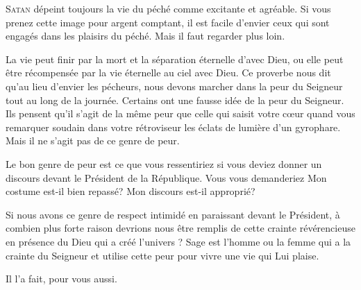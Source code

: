 



\lettrine{S}{atan} dépeint toujours la vie du péché
 comme excitante et agréable.
 Si vous prenez cette image pour argent comptant,
 il est facile d'envier ceux qui sont engagés
 dans les plaisirs du péché. Mais il faut regarder plus loin. 


La vie peut finir par la mort et la séparation éternelle d'avec Dieu,
 ou elle peut être récompensée par la vie éternelle au ciel avec Dieu.
 Ce proverbe nous dit qu'au lieu d'envier les pécheurs,
 nous devons marcher dans la peur 
 du Seigneur tout au long de la journée.
 Certains ont une fausse idée de la peur du Seigneur.
 Ils pensent qu'il s'agit de la même peur que celle qui saisit votre c\oe{}ur
 quand vous remarquer soudain dans votre rétroviseur les éclats de lumière
 d'un gyrophare. Mais il ne s'agit pas de ce genre de peur. 

Le bon genre de peur est ce que vous ressentiriez si vous deviez donner
 un discours devant le Président de la République.
 Vous vous demanderiez\frcolon{} 
 \Og Mon costume est-il bien repassé? 
 Mon discours est-il approprié? \Fg{}

Si nous avons ce genre de respect intimidé en paraissant devant le Président,
 à combien plus forte raison devrions nous être remplis de cette crainte
 révérencieuse en présence du Dieu qui a créé l'univers ?
 Sage est l'homme ou la femme qui a la crainte du Seigneur
 \ocadr et utilise cette peur pour vivre une vie qui Lui plaise. 

Il l'a fait, pour vous aussi.

\dvrule




